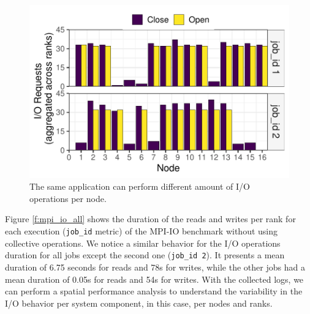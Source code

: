 \begin{figure}
	\centering
        \includegraphics[width=\linewidth]{figs/hacc_nfs_10.pdf}
	\caption{The same application can perform different amount of
          I/O operations per node.}
	\label{f:hacc2}
\end{figure}

Figure \ref{f:mpi_io_all} shows the duration of the reads and writes
per rank for each execution (\texttt{job\_id} metric) of the MPI-IO
benchmark without using collective operations. We notice a similar
behavior for the I/O operations duration for all jobs except the
second one (\texttt{job\_id 2}). It presents a mean duration of 6.75
seconds for reads and 78s for writes, while the other jobs had a mean
duration of 0.05s for reads and 54s for writes. With the collected
logs, we can perform a spatial performance analysis to understand the
variability in the I/O behavior per system component, in this case,
per nodes and ranks.

